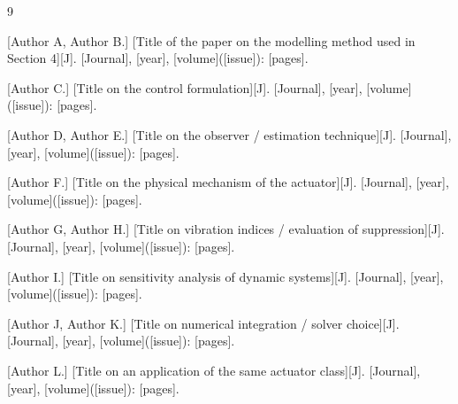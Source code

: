 %

\begin{thebibliography}{9}

[Author A, Author B.] [Title of the paper on the modelling method used in Section 4][J].
[Journal], [year], [volume]([issue]): [pages].

[Author C.] [Title on the control formulation][J]. [Journal], [year], [volume]([issue]): [pages].

[Author D, Author E.] [Title on the observer / estimation technique][J]. [Journal], [year],
[volume]([issue]): [pages].

[Author F.] [Title on the physical mechanism of the actuator][J]. [Journal], [year],
[volume]([issue]): [pages].

[Author G, Author H.] [Title on vibration indices / evaluation of suppression][J].
[Journal], [year], [volume]([issue]): [pages].

[Author I.] [Title on sensitivity analysis of dynamic systems][J]. [Journal], [year],
[volume]([issue]): [pages].

[Author J, Author K.] [Title on numerical integration / solver choice][J]. [Journal],
[year], [volume]([issue]): [pages].

[Author L.] [Title on an application of the same actuator class][J]. [Journal], [year],
[volume]([issue]): [pages].

\end{thebibliography}
